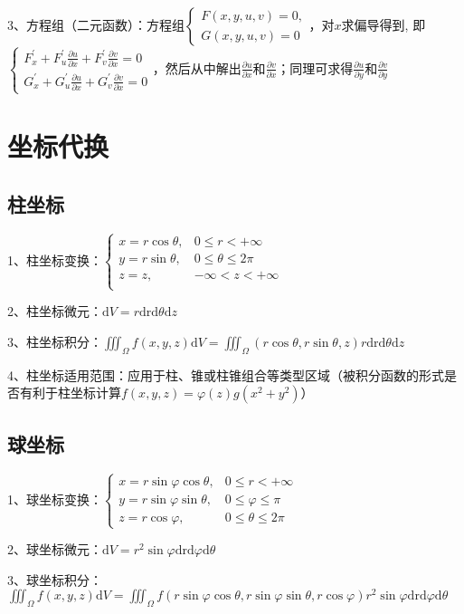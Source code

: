 3、方程组（二元函数）：方程组$\left\{\begin{array}{l}F(x, y, u, v)=0, \\ G(x, y, u, v)=0\end{array}\right.$，对$x$求偏导得到, 即$\left\{\begin{array}{l} F_{x}^{\prime}+F_{u}^{\prime} \frac{\partial u}{\partial x}+F_{v}^{\prime} \frac{\partial v}{\partial x}=0 \\ G_{x}^{\prime}+G_{u}^{\prime} \frac{\partial u}{\partial x}+G_{v}^{\prime} \frac{\partial v}{\partial x}=0 \end{array}\right.$，然后从中解出$\frac{\partial u}{\partial x}$和$\frac{\partial v}{\partial x}$；同理可求得$\frac{\partial u}{\partial y}$和$\frac{\partial v}{\partial y}$

\section{坐标代换}



\subsection{柱坐标}

1、柱坐标变换：$\begin{cases} x=r \cos \theta, & 0 \leqslant r < +\infty \\ y=r \sin \theta,& 0 \leqslant \theta \leqslant 2 \pi \\ z=z, &  -\infty<z<+\infty \\ \end{cases}$

2、柱坐标微元：$\mathrm{d} V=r \mathrm{drd} \theta \mathrm{d} z$

3、柱坐标积分：$\iiint_{\Omega} f(x, y, z) \mathrm{d} V=\iiint_{\Omega}(r \cos \theta, r \sin \theta, z) r \mathrm{drd} \theta \mathrm{d} z$

4、柱坐标适用范围：应用于柱、锥或柱锥组合等类型区域（被积分函数的形式是否有利于柱坐标计算$f(x, y, z)=\varphi(z) g\left(x^{2}+y^{2}\right)$）



\subsection{球坐标}

1、球坐标变换：$\begin{cases}x=r \sin \varphi \cos \theta, & 0 \leqslant r<+\infty \\ y=r \sin \varphi \sin \theta, & 0 \leqslant \varphi \leqslant \pi \\ z=r \cos \varphi, & 0 \leqslant \theta \leqslant 2 \pi\end{cases}$

2、球坐标微元：$\mathrm{d} V=r^{2} \sin \varphi \mathrm{drd} \varphi \mathrm{d} \theta$

3、球坐标积分：$\iiint_{\Omega} f(x, y, z) \mathrm{d} V=\iiint_{\Omega} f(r \sin \varphi \cos \theta, r \sin \varphi \sin \theta, r \cos \varphi) r^{2} \sin \varphi \mathrm{drd} \varphi \mathrm{d} \theta$

